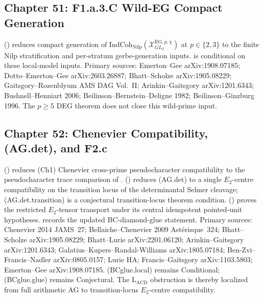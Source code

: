 \subsection{Chapter 51: F1.a.3.C Wild-EG Compact Generation}
\label{v4-arith:w5-synth:ch51}

(\ClaimStatusProvedHereConditional) reduces compact generation of
\(\mathrm{IndCoh}_{\mathrm{Nilp}}(\mathcal{X}^{\mathrm{EG},p,\chi}_{GL_{2}})\)
at \(p\in\{2,3\}\) to the finite Nilp stratification and per-stratum
gerbe-generation inputs.
 is conditional on
these local-model inputs.
Primary sources: Emerton--Gee arXiv:1908.07185;
Dotto--Emerton--Gee arXiv:2603.26887; Bhatt--Scholze arXiv:1905.08229;
Gaitsgory--Rozenblyum AMS DAG Vol.~II; Arinkin--Gaitsgory
arXiv:1201.6343; Bushnell--Henniart 2006; Beilinson--Bernstein--Deligne
1982; Beilinson--Ginzburg 1996.
The \(p\geq5\) DEG theorem does not close this wild-prime input.

\subsection{Chapter 52: Chenevier Compatibility, (AG.det), and F2.c}
\label{v4-arith:w5-synth:ch52}

(\ClaimStatusProvedHereConditional) reduces (Ch1) Chenevier
cross-prime pseudocharacter compatibility to the pseudocharacter
trace comparison of
.
 (\ClaimStatusProvedHere)
reduces (AG.det) to a single \(E_{2}\)-centre compatibility on the
transition locus of the determinantal Selmer cleavage;
(AG.det.transition) is a conjectural transition-locus theorem
condition.
 (\ClaimStatusProvedHere)
proves the restricted \(E_{2}\)-tensor transport under its central
idempotent pointed-unit hypotheses.
 records the updated
BC-diamond-glue statement.
Primary sources: Chenevier 2014 JAMS~27; Bellaiche--Chenevier 2009
Ast\'erisque~324; Bhatt--Scholze arXiv:1905.08229; Bhatt--Lurie
arXiv:2201.06120; Arinkin--Gaitsgory arXiv:1201.6343;
Galatius--Kupers--Randal-Williams arXiv:1805.07184;
Ben-Zvi--Francis--Nadler arXiv:0805.0157; Lurie HA;
Francis--Gaitsgory arXiv:1103.5803; Emerton--Gee arXiv:1908.07185.
(BCglue.local) remains Conditional; (BCglue.glue) remains
Conjectural. The \(\mathrm{L}_{\mathrm{ACD}}\) obstruction is thereby
localized from full arithmetic AG to transition-locus
\(E_{2}\)-centre compatibility.

